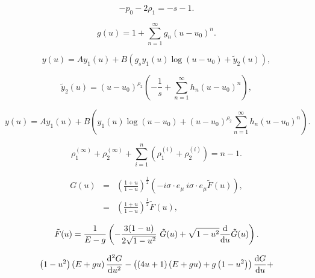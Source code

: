 \documentclass[]{article}
\begin{document}
		

		

	
	\begin{equation}
		-p_0 -2\rho_1 = -s-1.
	\end{equation}
	
	\begin{equation}
		\label{gs}
		g(u) = 1 + \sum\limits_{n=1}^{\infty} g_n (u-u_0)^n.
	\end{equation}
	
	\begin{equation}
		y(u) = A y_1(u) + B \left(g_s y_1(u) \log(u - u_0) + {\tilde y}_2(u)
		\right),
	\end{equation}
	
	\begin{equation}
		{\tilde y}_2(u) = (u-u_0)^{\rho_2} \left( -\frac{1}{s} + 
		\sum\limits_{n=1}^\infty h_n(u-u_0)^n \right),
	\end{equation}
	
	\begin{equation}
		\label{log}
		y(u) = A y_1(u) + B \left(y_1(u) \log(u - u_0) 
		+ (u-u_0)^{\rho_2} \sum\limits_{n=1}^\infty h_n(u-u_0)^n
		\right).
	\end{equation}
	
	\begin{equation}
		\label{erelation}
		\rho_1^{(\infty)} + \rho_2^{(\infty)} + \sum\limits_{i=1}^{n} \left(
		\rho_1^{(i)} + \rho_2^{(i)} \right) = n-1.
	\end{equation}

	

	
	\begin{eqnarray}
		\nonumber
		G(u) &=& 
		\left( \frac{1+u}{1-u} \right)^{\frac{1}{2}}
		\left( -i \sigma \cdot e_\mu~ i \sigma \cdot e_\mu 
		{\tilde F}(u) \right), \\
		&=& \left( \frac{1+u}{1-u} \right)^{\frac{1}{2}}{\tilde F}(u),
	\end{eqnarray}
	

	
	\begin{equation}
		{\tilde F}(u) = \frac{1}{E-g} \left(
		- \frac{3(1-u)}{2 \sqrt{1-u^2}}~ {\tilde G}(u) 
		+ \sqrt{1-u^2} \frac{{\rm d}}{{\rm d} u} {\tilde G}(u) 
		\right).
	\end{equation}
	

	


	
	\begin{equation}
		\label{G(u)k=1}
		\left(1-u^2\right)\left(E+gu\right) \frac{{\rm d}^2 G}{{\rm d} u^2} 
		- \left(\left(4u+1\right)\left(E+gu\right) + g\left(1-u^2\right)\right) 
		\frac{{\rm d} G}{{\rm d} u} + 
	\end{equation}
	
\end{document}
